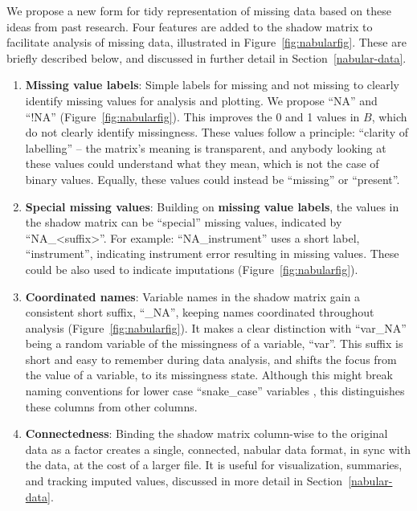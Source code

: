 \documentclass[article]{jss}
\begin{document}
We propose a new form for tidy representation of missing data based on these
ideas from past research.  Four features are added to the shadow matrix to
facilitate analysis of missing data, illustrated in
Figure~\ref{fig:nabularfig}.  These are briefly described below, and
discussed in further detail in Section~\ref{nabular-data}.
%
\begin{enumerate}
%
\item
  \textbf{Missing value labels}:  Simple labels for missing and not missing
to clearly identify missing values for analysis and plotting.  We propose
``NA'' and ``!NA'' (Figure~\ref{fig:nabularfig}).  This improves the 0 and
1 values in \(B\), which do not clearly identify missingness.  These values
follow a principle: ``clarity of labelling'' -- the matrix's meaning
is transparent, and anybody looking at these values could understand what
they mean, which is not the case of binary values.  Equally, these values
could instead be ``missing'' or ``present''.
%
\item
  \textbf{Special missing values}: Building on \textbf{missing value
labels}, the values in the shadow matrix can be ``special'' missing values,
indicated by ``NA\_\textless suffix\textgreater{}''.  For example:
``NA\_instrument'' uses a short label, ``instrument'', indicating instrument
error resulting in missing values.  These could be also used to indicate
imputations (Figure~\ref{fig:nabularfig}).
%
\item
  \textbf{Coordinated names}: Variable names in the shadow matrix gain a
consistent short suffix, ``\_NA'', keeping names coordinated throughout
analysis (Figure~\ref{fig:nabularfig}).  It makes a clear distinction with
``var\_NA'' being a random variable of the missingness of a variable,
``var''.  This suffix is short and easy to remember during data analysis,
and shifts the focus from the value of a variable, to its missingness state.
Although this might break naming conventions for lower case ``snake\_case''
variables \citep[e.g.,][]{Wickham2014}, this distinguishes these columns from
other columns.
%
\item
  \textbf{Connectedness}: Binding the shadow matrix column-wise to the
original data as a factor creates a single, connected, nabular data format,
in sync with the data, at the cost of a larger file.  It is useful for
visualization, summaries, and tracking imputed values, discussed in more
detail in Section~\ref{nabular-data}.
\end{enumerate}
\end{document}

